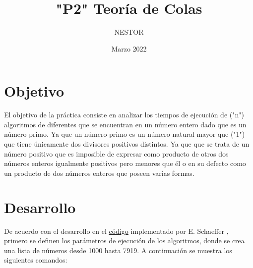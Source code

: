 \documentclass{article}
\title{"P2" Teoría de Colas} %
\author{NESTOR}
\date{Marzo 2022}
\begin{document}

\maketitle %


 

\section{Objetivo}
El objetivo de la pr\'actica consiste en analizar los tiempos de ejecuci\'on de ("n") algoritmos de diferentes que se encuentran en un número entero dado que es un número primo. Ya que un número primo es un número natural mayor que ("1") que tiene únicamente dos divisores positivos distintos. Ya que que se trata de un número positivo que es imposible de expresar como producto de otros dos números enteros igualmente positivos pero menores que él o en su defecto como un producto de dos números enteros que poseen varias formas.

\section{Desarrollo}
De acuerdo con el desarrollo en el \href{https://github.com/satuelisa/Simulation/blob/master/QueuingTheory/ordering.py}{c\'odigo} implementado por E. Schaeffer \cite{elisa1}, primero se definen los parámetros de ejecución de los algoritmos, donde se crea una lista de n\'umeros desde 1000 hasta 7919. A continuación se muestra los siguientes comandos:
\end{document}
